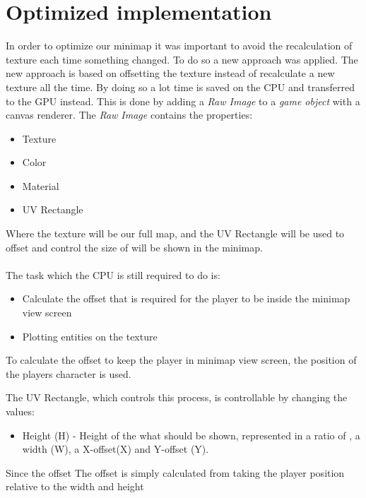 \section{Optimized implementation}
In order to optimize our minimap it was important to avoid the recalculation of texture each time something changed.
To do so a new approach was applied. 
The new approach is based on offsetting the texture instead of recalculate a new texture all the time.
By doing so a lot time is saved on the CPU and transferred to the GPU instead. 
This is done by adding a \textit{Raw Image} to a \textit{game object} with a canvas renderer.
The \textit{Raw Image} contains the properties:
\begin{itemize}
\item Texture
\item Color
\item Material
\item UV Rectangle
\end{itemize}
Where the texture will be our full map, and the UV Rectangle will be used to offset and control the size of will be shown in the minimap.
\\\\
The task which the CPU is still required to do is:
\begin{itemize}
\item Calculate the offset that is required for the player to be inside the minimap view screen
\item Plotting entities on the texture
\end{itemize}
To calculate the offset to keep the player in minimap view screen, the position of the players character is used.

The UV Rectangle, which controls this process, is controllable by changing the values:
\begin{itemize}
\item Height (H) - Height of the what should be shown, represented in a ratio of
, a width (W), a X-offset(X) and Y-offset (Y).
\end{itemize}

Since the offset The offset is simply calculated from taking the player position relative to the width and height 
